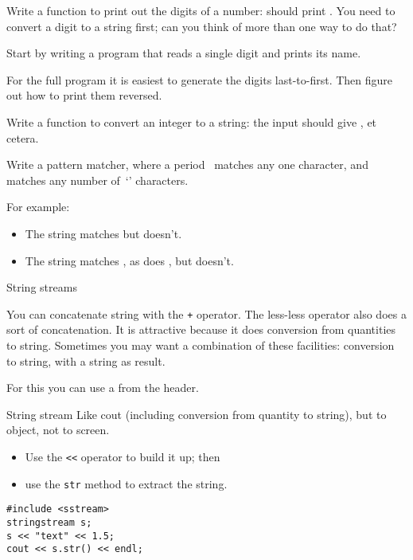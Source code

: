 \begin{exercise}
  \label{ex:printdigits}
  Write a function to print out the digits of a number:  should
  print .
  You need to convert a digit to a string first; can you think of more
  than one way to do that?

  Start by writing a program that reads a single digit and prints its name.

  For the full program it is easiest to generate the  digits last-to-first.
  Then figure out how to print them reversed.
\end{exercise}

\begin{exercise}
  \label{ex:printnumber}
  Write a function to convert an integer to a string: the input
   should give , et cetera.
\end{exercise}

\begin{exercise}
  Write a pattern matcher, where a period~ matches any one
  character, and  matches any number of~`' characters.

  For example:
  \begin{itemize}
  \item The string  matches  but  doesn't.
  \item The string  matches , as does , but
     doesn't.
  \end{itemize}
\end{exercise}

 {String streams}
\label{sec:stringstream}

You can concatenate string with the \lstinline{+} operator.
The less-less operator also does a sort of concatenation. It is
attractive because it does conversion from quantities to string.
Sometimes you may want a combination of these facilities: conversion
to string, with a string as result.

For this you can use a 
from the  header.

\begin{block}{String stream}
  \label{sl:sstream}
  Like cout (including conversion from quantity to string), but to
  object, not to screen.
\begin{itemize}
\item Use the \lstinline{<<} operator to build it up; then
\item use the \lstinline{str} method to extract the string.
\end{itemize}
\begin{lstlisting}
#include <sstream>
stringstream s;
s << "text" << 1.5;
cout << s.str() << endl;
\end{lstlisting}
\end{block}

